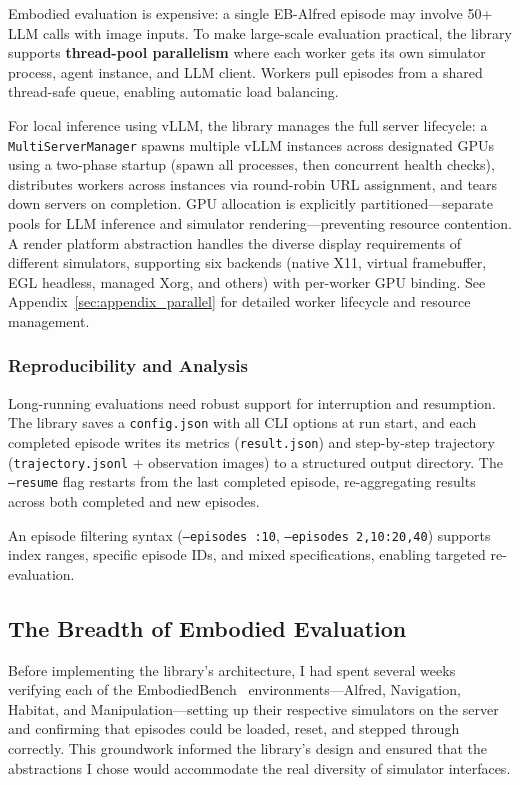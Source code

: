 \documentclass[
hf,
]{confart}
\begin{document}
Embodied evaluation is expensive: a single EB-Alfred episode may involve 50+ LLM calls with image inputs. To make large-scale evaluation practical, the library supports \textbf{thread-pool parallelism} where each worker gets its own simulator process, agent instance, and LLM client. Workers pull episodes from a shared thread-safe queue, enabling automatic load balancing.

For local inference using vLLM, the library manages the full server lifecycle: a \texttt{MultiServerManager} spawns multiple vLLM instances across designated GPUs using a two-phase startup (spawn all processes, then concurrent health checks), distributes workers across instances via round-robin URL assignment, and tears down servers on completion. GPU allocation is explicitly partitioned---separate pools for LLM inference and simulator rendering---preventing resource contention. A render platform abstraction handles the diverse display requirements of different simulators, supporting six backends (native X11, virtual framebuffer, EGL headless, managed Xorg, and others) with per-worker GPU binding. See Appendix~\ref{sec:appendix_parallel} for detailed worker lifecycle and resource management.

\subsubsection{Reproducibility and Analysis}

Long-running evaluations need robust support for interruption and resumption. The library saves a \texttt{config.json} with all CLI options at run start, and each completed episode writes its metrics (\texttt{result.json}) and step-by-step trajectory (\texttt{trajectory.jsonl} + observation images) to a structured output directory. The \texttt{--resume} flag restarts from the last completed episode, re-aggregating results across both completed and new episodes.

An episode filtering syntax (\texttt{--episodes :10}, \texttt{--episodes 2,10:20,40}) supports index ranges, specific episode IDs, and mixed specifications, enabling targeted re-evaluation.

\subsection{The Breadth of Embodied Evaluation}

Before implementing the library's architecture, I had spent several weeks verifying each of the EmbodiedBench~\cite{yang2025embodiedbenchcomprehensivebenchmarkingmultimodal} environments---Alfred, Navigation, Habitat, and Manipulation---setting up their respective simulators on the server and confirming that episodes could be loaded, reset, and stepped through correctly. This groundwork informed the library's design and ensured that the abstractions I chose would accommodate the real diversity of simulator interfaces.
\end{document}
